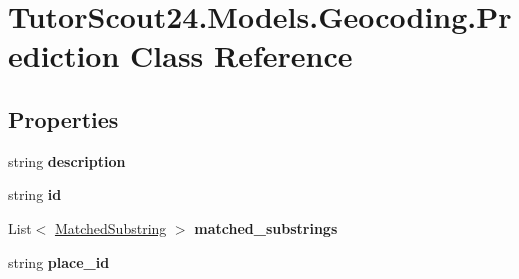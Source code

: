 \hypertarget{class_tutor_scout24_1_1_models_1_1_geocoding_1_1_prediction}{}\section{Tutor\+Scout24.\+Models.\+Geocoding.\+Prediction Class Reference}
\label{class_tutor_scout24_1_1_models_1_1_geocoding_1_1_prediction}
\subsection*{Properties}
\begin{DoxyCompactItemize}
\item 
\mbox{\label{class_tutor_scout24_1_1_models_1_1_geocoding_1_1_prediction_a3da2a23ddea3e09f6ebea5d2720162a5}} 
string {\bfseries description}
\item 
\mbox{\label{class_tutor_scout24_1_1_models_1_1_geocoding_1_1_prediction_a037f68aa93f10fc18bdaf1d83d30c255}} 
string {\bfseries id}
\item 
\mbox{\label{class_tutor_scout24_1_1_models_1_1_geocoding_1_1_prediction_ae60074b1d6a493bc4b27ea3a3ed4f55e}} 
List$<$ \mbox{\hyperlink{class_tutor_scout24_1_1_models_1_1_geocoding_1_1_matched_substring}{Matched\+Substring}} $>$ {\bfseries matched\+\_\+substrings}
\item 
\mbox{\label{class_tutor_scout24_1_1_models_1_1_geocoding_1_1_prediction_ac4e6141e1d298cf389c7cd0dc53317e5}} 
string {\bfseries place\+\_\+id}
\item 
\mbox{\label{class_tutor_scout24_1_1_models_1_1_geocoding_1_1_prediction_a9aa1a388dd6cd6ae9766be5b0a780c15}} 

\end{DoxyCompactItemize}
